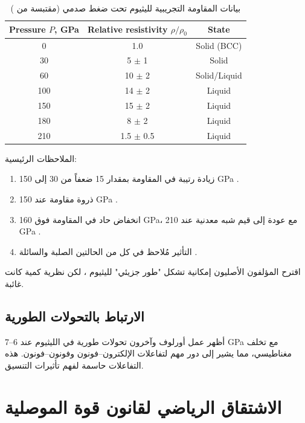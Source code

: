 \documentclass[12pt,a4paper]{article}
\theoremstyle{remark}
\begin{document}
	\begin{otherlanguage}{english}
		\begin{table}[H]
			\centering
			\caption{بيانات المقاومة التجريبية لليثيوم تحت ضغط صدمي (مقتبسة من \cite{fortov2001, yakushev2002})}
			\label{tab:exp_data}
			\begin{tabular}{ccc}
				\toprule
				\textbf{Pressure \(P\), GPa} & \textbf{Relative resistivity \(\rho/\rho_0\)} & \textbf{State} \\
				\midrule
				0 & 1.0 & Solid (BCC) \\
				30 & 5 \(\pm\) 1 & Solid \\
				60 & 10 \(\pm\) 2 & Solid/Liquid \\
				100 & 14 \(\pm\) 2 & Liquid \\
				150 & 15 \(\pm\) 2 & Liquid \\
				180 & 8 \(\pm\) 2 & Liquid \\
				210 & 1.5 \(\pm\) 0.5 & Liquid \\
				\bottomrule
			\end{tabular}
		\end{table}
	\end{otherlanguage}
	
	الملاحظات الرئيسية:
	\begin{enumerate}
		\item زيادة رتيبة في المقاومة بمقدار 15 ضعفاً من 30 إلى 150 GPa \cite{fortov2001}.
		\item ذروة مقاومة عند 150 GPa \cite{yakushev2002}.
		\item انخفاض حاد في المقاومة فوق 160 GPa، مع عودة إلى قيم شبه معدنية عند 210 GPa \cite{yakushev2002}.
		\item التأثير مُلاحظ في كل من الحالتين الصلبة والسائلة \cite{fortov2001}.
	\end{enumerate}
	
	اقترح المؤلفون الأصليون إمكانية تشكل "طور جزيئي" لليثيوم \cite{fortov1999}، لكن نظرية كمية كانت غائبة.
	
	\subsection{الارتباط بالتحولات الطورية}
	
	أظهر عمل أورلوف وآخرون \cite{orlov2001} تحولات طورية في الليثيوم عند 6–7 GPa مع تخلف مغناطيسي، مما يشير إلى دور مهم لتفاعلات الإلكترون–فونون وفونون–فونون. هذه التفاعلات حاسمة لفهم تأثيرات التنسيق.
	
	\section{الاشتقاق الرياضي لقانون قوة الموصلية}
	
\end{document}
